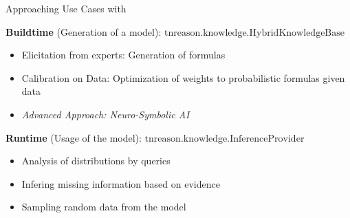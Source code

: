 \documentclass{beamer}
\begin{document}
\begin{frame}{Approaching Use Cases with \tnreason}

\textbf{Buildtime} (Generation of a model): 
\emph{$\mathrm{tnreason.knowledge.HybridKnowledgeBase}$}
\begin{itemize}
	\item Elicitation from experts: Generation of formulas 
	\item Calibration on Data: Optimization of weights to probabilistic formulas given data
	\item \textit{Advanced Approach: Neuro-Symbolic AI}
\end{itemize}
\medskip 

\textbf{Runtime} (Usage of the model): 
 \emph{$\mathrm{tnreason.knowledge.InferenceProvider}$}
\begin{itemize}
	\item Analysis of distributions by queries
	\item Infering missing information based on evidence
	\item Sampling random data from the model
\end{itemize}

\end{frame}
\end{document}
